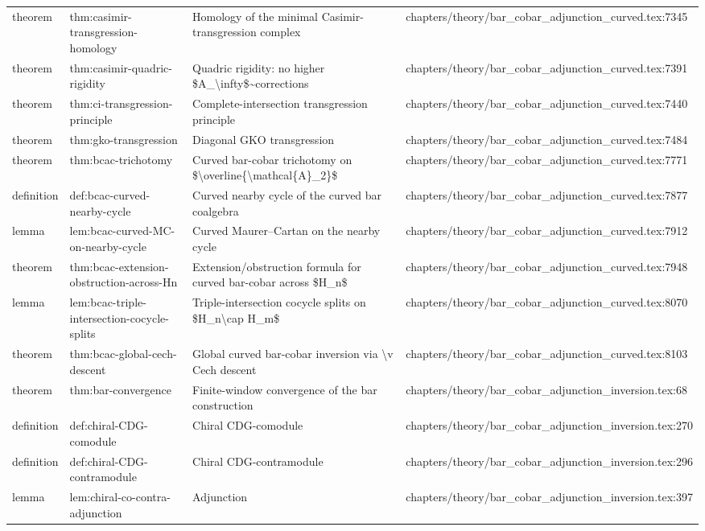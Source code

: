 \documentclass[11pt]{article}
\begin{document}
\begin{longtable}{L{0.10\textwidth}L{0.26\textwidth}L{0.42\textwidth}L{0.22\textwidth}}
theorem & thm:casimir-transgression-homology & Homology of the minimal Casimir-transgression complex & chapters/theory/bar\_cobar\_adjunction\_curved.tex:7345\\
theorem & thm:casimir-quadric-rigidity & Quadric rigidity: no higher \$A\_\textbackslash{}infty\$\textasciitilde{}corrections & chapters/theory/bar\_cobar\_adjunction\_curved.tex:7391\\
theorem & thm:ci-transgression-principle & Complete-intersection transgression principle & chapters/theory/bar\_cobar\_adjunction\_curved.tex:7440\\
theorem & thm:gko-transgression & Diagonal GKO transgression & chapters/theory/bar\_cobar\_adjunction\_curved.tex:7484\\
theorem & thm:bcac-trichotomy & Curved bar-cobar trichotomy on \$\textbackslash{}overline\{\textbackslash{}mathcal\{A\}\_2\}\$ & chapters/theory/bar\_cobar\_adjunction\_curved.tex:7771\\
definition & def:bcac-curved-nearby-cycle & Curved nearby cycle of the curved bar coalgebra & chapters/theory/bar\_cobar\_adjunction\_curved.tex:7877\\
lemma & lem:bcac-curved-MC-on-nearby-cycle & Curved Maurer--Cartan on the nearby cycle & chapters/theory/bar\_cobar\_adjunction\_curved.tex:7912\\
theorem & thm:bcac-extension-obstruction-across-Hn & Extension/obstruction formula for curved bar-cobar across \$H\_n\$ & chapters/theory/bar\_cobar\_adjunction\_curved.tex:7948\\
lemma & lem:bcac-triple-intersection-cocycle-splits & Triple-intersection cocycle splits on \$H\_n\textbackslash{}cap H\_m\$ & chapters/theory/bar\_cobar\_adjunction\_curved.tex:8070\\
theorem & thm:bcac-global-cech-descent & Global curved bar-cobar inversion via \textbackslash{}v Cech descent & chapters/theory/bar\_cobar\_adjunction\_curved.tex:8103\\
theorem & thm:bar-convergence & Finite-window convergence of the bar construction & chapters/theory/bar\_cobar\_adjunction\_inversion.tex:68\\
definition & def:chiral-CDG-comodule & Chiral CDG-comodule & chapters/theory/bar\_cobar\_adjunction\_inversion.tex:270\\
definition & def:chiral-CDG-contramodule & Chiral CDG-contramodule & chapters/theory/bar\_cobar\_adjunction\_inversion.tex:296\\
lemma & lem:chiral-co-contra-adjunction & Adjunction & chapters/theory/bar\_cobar\_adjunction\_inversion.tex:397\\

\end{longtable}
\end{document}
